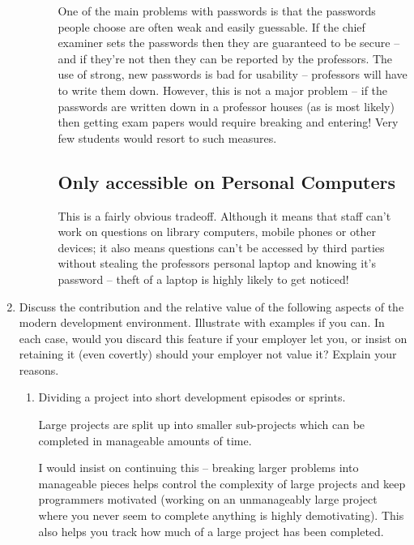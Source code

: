 \documentclass[10pt,\jkfside,a4paper]{article}
\begin{document}
\begin{enumerate}
\begin{enumerate}
\begin{enumerate}[label=(\roman*)]
One of the main problems with passwords is that the passwords people choose
are often weak and easily guessable. If the chief examiner sets the passwords
then they are guaranteed to be secure -- and if they're not then they can be
reported by the professors. The use of strong, new passwords is bad for usability --
professors will have to write them down. However, this is not a major problem --
if the passwords are written down in a professor houses (as is most likely) then
getting exam papers would require breaking and entering! Very few students would
resort to such measures.

\subsection*{Only accessible on Personal Computers}

This is a fairly obvious tradeoff. Although it means that staff can't work on
questions on library computers, mobile phones or other devices; it also means
questions can't be accessed by third parties without stealing the professors
personal laptop and knowing it's password -- theft of a laptop is highly likely
to get noticed!

\end{enumerate}

\end{enumerate}

\item \label{itm:relativevalue} Discuss the contribution and the relative value of the following aspects of the modern
development environment. Illustrate with examples if you can. In each case, would you discard 
this feature if your employer let you, or insist on retaining it (even covertly) should your 
employer not value it? Explain your reasons.

\begin{enumerate}

\item Dividing a project into short development episodes or sprints.

Large projects are split up into smaller sub-projects which can be
completed in manageable amounts of time.

I would insist on continuing this -- breaking larger problems into manageable
pieces helps control the complexity of large projects and keep programmers
motivated (working on an unmanageably large project where you never seem to
complete anything is highly demotivating). This also helps you track how much
of a large project has been completed.


\end{enumerate}
\end{enumerate}
\end{document}
